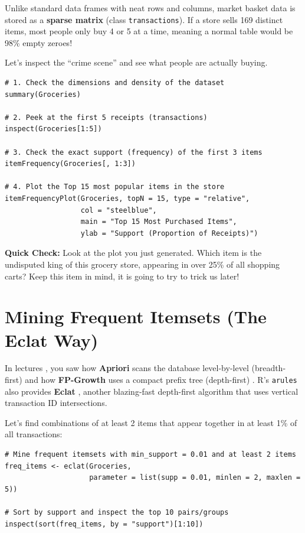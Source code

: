 \documentclass[11pt]{article}
\begin{document}
Unlike standard data frames with neat rows and columns, market basket data is stored as a \textbf{sparse matrix} (class \texttt{transactions}). If a store sells 169 distinct items, most people only buy 4 or 5 at a time, meaning a normal table would be 98\% empty zeroes!

Let's inspect the ``crime scene'' and see what people are actually buying.

\begin{lstlisting}[caption={Inspecting the sparse transaction matrix and top items.}]
# 1. Check the dimensions and density of the dataset
summary(Groceries)

# 2. Peek at the first 5 receipts (transactions)
inspect(Groceries[1:5])

# 3. Check the exact support (frequency) of the first 3 items
itemFrequency(Groceries[, 1:3])

# 4. Plot the Top 15 most popular items in the store
itemFrequencyPlot(Groceries, topN = 15, type = "relative",
                  col = "steelblue", 
                  main = "Top 15 Most Purchased Items",
                  ylab = "Support (Proportion of Receipts)")
\end{lstlisting}

\textbf{Quick Check:} Look at the plot you just generated. Which item is the undisputed king of this grocery store, appearing in over 25\% of all shopping carts? Keep this item in mind, it is going to try to trick us later!

\section{Mining Frequent Itemsets (The Eclat Way)}

In lectures \cite{han2011data}, you saw how \textbf{Apriori} scans the database level-by-level (breadth-first) \cite{agrawal1994fast} and how \textbf{FP-Growth} uses a compact prefix tree (depth-first) \cite{han2000mining}. R's \texttt{arules} also provides \textbf{Eclat} \cite{zaki2000scalable}, another blazing-fast depth-first algorithm that uses vertical transaction ID intersections.

Let's find combinations of at least 2 items that appear together in at least 1\% of all transactions:

\begin{lstlisting}[caption={Mining frequent itemsets using the Eclat algorithm.}]
# Mine frequent itemsets with min_support = 0.01 and at least 2 items
freq_items <- eclat(Groceries, 
                    parameter = list(supp = 0.01, minlen = 2, maxlen = 5))

# Sort by support and inspect the top 10 pairs/groups
inspect(sort(freq_items, by = "support")[1:10])
\end{lstlisting}
\end{document}
